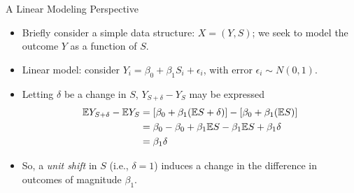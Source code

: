 \documentclass{beamer}
\begin{document}




\begin{frame}[c]{A Linear Modeling Perspective}

\begin{center}
\begin{itemize}
  \itemsep6pt
  \item Briefly consider a simple data structure: $X = (Y, S)$; we seek to model
    the outcome $Y$ as a function of $S$.
  \item Linear model: consider $Y_i = \beta_0 + \beta_1 S_i + \epsilon_i$, with
    error $\epsilon_i \sim N(0, 1)$.
  \item Letting $\delta$ be a change in $S$, $Y_{S + \delta} - Y_S$ may be
    expressed
    \begin{align*}
      \mathbb{E} Y_{S + \delta} - \mathbb{E} Y_S &= [\beta_0 + \beta_1 (\mathbb{E} S + \delta)] -
        [\beta_0 + \beta_1 (\mathbb{E} S)] \\
        &= \beta_0 - \beta_0 + \beta_1 \mathbb{E} S - \beta_1 \mathbb{E} S + \beta_1 \delta \\
        &= \beta_1 \delta
    \end{align*}
  \item So, a \textit{unit shift} in $S$ (i.e., $\delta = 1$) induces a
    change in the difference in outcomes of magnitude $\beta_1$.
\end{itemize}
\end{center}


\end{frame}
\end{document}
